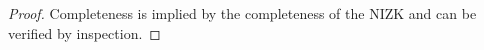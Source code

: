 \begin{proof}
Completeness is implied by the completeness of the NIZK and can be verified by inspection. 



%
%
%
%
%




\end{proof}
